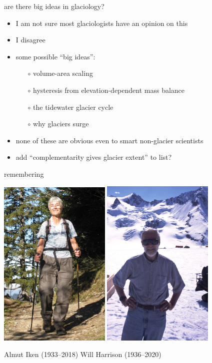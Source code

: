 \documentclass[10pt,hyperref,dvipsnames]{beamer}
\begin{document}
\begin{frame}{are there big ideas in glaciology?}
\begin{itemize}
\item I am not sure most glaciologists have an opinion on this
\item<2-4> I disagree

\bigskip
\item<3-4> some possible ``big ideas'':
    \begin{itemize}
    \item[$\circ$] volume-area scaling
    \item[$\circ$] hysteresis from elevation-dependent mass balance
    \item[$\circ$] the tidewater glacier cycle
    \item[$\circ$] why glaciers surge
    \end{itemize}
\item<3-4> none of these are obvious even to smart non-glacier scientists

\bigskip
\item<4> add ``complementarity gives glacier extent'' to list?
\end{itemize}
\end{frame}


\begin{frame}{remembering}

\includegraphics[width=0.4\textwidth]{figs/Iken_front_crop.jpg} \hfill \includegraphics[width=0.4\textwidth]{figs/Will-by-Truffer.jpg}

Almut Iken (1933--2018) \hfill Will Harrison (1936--2020)
\end{frame}
\end{document}
